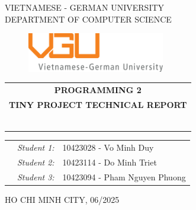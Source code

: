\documentclass[11pt]{report}
\theoremstyle{mytheor}
\begin{document}
\begin{titlepage}
\begin{center}
VIETNAMESE - GERMAN UNIVERSITY \\
DEPARTMENT OF COMPUTER SCIENCE
\end{center}

\vspace{1cm}

\begin{figure}[h!]
\begin{center}
\includegraphics[width=6cm]{assets/vgu_logo_large.png}
\end{center}
\end{figure}

\vspace{2cm}

\begin{center}
\begin{tabular}{c}
\multicolumn{1}{c}{\textbf{{\Large PROGRAMMING 2}}} \\ 
\multicolumn{1}{c}{\textbf{{\Large TINY PROJECT TECHNICAL REPORT}}}

~~\\

\\
\multicolumn{1}{l}{\textbf{{\Large}}}\\
\\
\textbf{{\Large}}\\

\\
\\

\end{tabular}
\end{center}

\vspace{3cm}

\begin{table}[h]
\centering
\begin{tabular}{rrl}
&\textit{Student 1:} & 10423028 - Vo Minh Duy \\
&\textit{Student 2:} & 10423114 - Do Minh Triet \\
&\textit{Student 3:} & 10423094 - Pham Nguyen Phuong \\
\end{tabular}
\end{table}

\vspace{3cm}

\begin{center}
{\footnotesize HO CHI MINH CITY, 06/2025}
\end{center}

\end{titlepage}

\renewcommand{\contentsname}{Content}
\newpage
\vspace{1cm}
\tableofcontents
\end{document}
